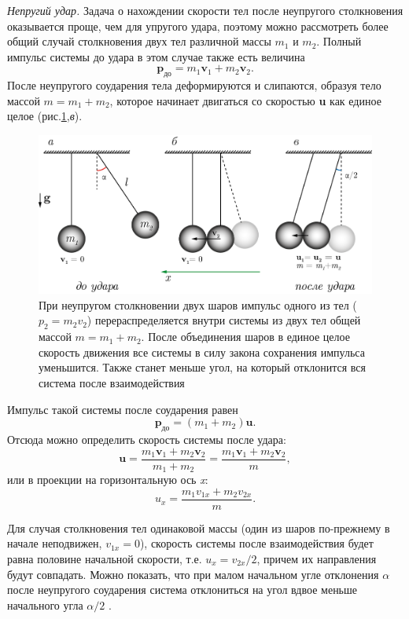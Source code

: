 \documentclass[All.tex]{subfiles}
\begin{document}
\textit{Непругий удар.}
Задача о нахождении скорости тел после неупругого столкновения оказывается проще, чем для упругого удара, поэтому можно рассмотреть более общий случай столкновения двух тел различной массы  $ m_1 $ и  $ m_2 $.
Полный импульс системы до удара в этом случае также есть величина $$ \textbf{p}_{\text{до}}  = m_1 \textbf{v}_1 + m_2 \textbf{v}_2.$$
После неупругого соударения тела деформируются и слипаются, образуя тело массой $m = m_1 + m_2 $, которое начинает двигаться со скоростью \textbf{u} как единое целое (рис.\ref{hit-5},\textit{в}).

\begin{figure}[H]
	\centering 	
	\includegraphics[width=0.9\linewidth]{hit-5.png}
	\caption{При неупругом столкновении двух шаров импульс одного из тел ($ p_2=m_2v_2 $) перераспределяется внутри системы из двух тел общей массой $ m= m_1 + m_2 $. После объединения шаров в единое целое скорость движения все системы в силу закона сохранения импульса уменьшится. Также станет меньше угол, на который отклонится вся система после взаимодействия}
	\label{hit-5}
\end{figure}

Импульс такой системы после соударения равен $$ \textbf{p}_{\text{до}}  = (m_1 + m_2) \textbf{u}.$$
Отсюда можно определить скорость системы после удара:
	\begin{equation}\label{hit-1eq6}
\textbf{u}  = \dfrac{m_1 \textbf{v}_1 + m_2 \textbf{v}_2}{m_1 + m_2}=\dfrac{m_1 \textbf{v}_1 + m_2 \textbf{v}_2}{m},
\end{equation}
или в проекции на горизонтальную ось \textit{x}:
	\begin{equation}\label{hit-1eq7}
u_x  = \dfrac{m_1 v_{1x} + m_2 v_{2x}}{m}.
\end{equation}

Для случая столкновения тел одинаковой массы (один из шаров по-прежнему в начале неподвижен, $ v_{1x}=0 $), скорость системы после взаимодействия будет равна половине начальной скорости, т.е. $ u_x = v_{2x}/2 $, причем их направления будут совпадать.
Можно показать, что при малом начальном угле отклонения $\alpha$ после неупругого соударения система отклониться на угол вдвое меньше начального угла $\alpha/2$ .
\end{document}
